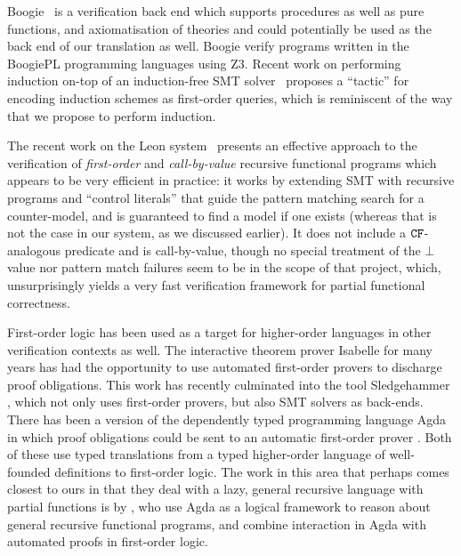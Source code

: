 Boogie~\cite{boogie} is a verification back end which supports procedures as well as 
pure functions, and axiomatisation of theories and could potentially be used as the 
back end of our translation as well. Boogie verify programs written in the BoogiePL 
programming languages using Z3. Recent work on performing induction on-top of an 
induction-free SMT solver~\cite{Leino:2012:AIS:2189257.2189278} proposes a ``tactic''
for encoding induction schemes as first-order queries, which is reminiscent of the way
that we propose to perform induction.

The recent work on the Leon system~\cite{Suter:2011:SMR:2041552.2041575} presents
an effective approach to the verification of {\em first-order} and {\em call-by-value} 
recursive functional programs which appears to be very efficient in practice: it works
by extending SMT with recursive programs and ``control literals'' that guide the pattern
matching search for a counter-model, and is guaranteed to find a model if one exists 
(whereas that is not the case in our system, as we discussed earlier). It does not include
a ${\tt CF}$-analogous predicate and is call-by-value, though no special treatment of the $\bot$ 
value nor pattern match failures seem to be in the scope of that project, which, unsurprisingly
yields a very fast verification framework for partial functional correctness. 

First-order logic has been used as a target for higher-order languages in other verification contexts as well.
The interactive theorem prover Isabelle for many years has had the opportunity to use
automated first-order provers to discharge proof obligations. This work has recently culminated into the tool
Sledgehammer \cite{Sledgehammer}, which not only uses first-order provers, but also SMT solvers as back-ends.
There has been a version of the dependently typed programming language Agda in which
proof obligations could be sent to an automatic first-order prover \cite{AgdaFOL}. Both of these use typed translations from a typed higher-order language of well-founded definitions to first-order logic. The work in this area that perhaps comes closest to ours in that they deal with a lazy, general recursive language with partial functions is by \citet{TypeTheoryFOL}, who use Agda as a logical framework to reason about general recursive functional programs, and combine interaction in Agda with automated proofs in first-order logic.

